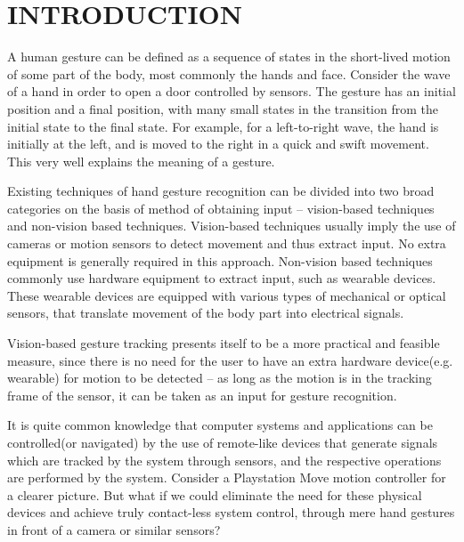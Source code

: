 \documentclass[oneside,a4paper,12pt]{report}
\begin{document}
\tableofcontents
\listoffigures 
\listoftables



\mainmatter











\setlength{\parindent}{11mm}





\chapter{INTRODUCTION}

        A human gesture can be defined as a sequence of states in the short-lived motion of some part of the body, most commonly the hands and face. Consider the wave of a hand in order to open a door controlled by sensors. The gesture has an initial position and a final position, with many small states in the transition from the initial state to the final state. For example, for a left-to-right wave, the hand is initially at the left, and is moved to the right in a quick and swift movement. This very well explains the meaning of a gesture.
    
    
         Existing techniques of hand gesture recognition can be divided into two broad categories on the basis of method of obtaining input – vision-based techniques and non-vision based techniques. Vision-based techniques usually imply the use of cameras or motion sensors to detect movement and thus extract input. No extra equipment is generally required in this approach. Non-vision based techniques commonly use hardware equipment to extract input, such as wearable devices. These wearable devices are equipped with various types of mechanical or optical sensors, that translate movement of the body part into electrical signals.
    
    
         Vision-based gesture tracking presents itself to be a more practical and feasible measure, since there is no need for the user to have an extra hardware device(e.g. wearable) for motion to be detected – as long as the motion is in the tracking frame of the sensor, it can be taken as an input for gesture recognition.
    
    
         It is quite common knowledge that computer systems and applications can be controlled(or navigated) by the use of remote-like devices that generate signals which are tracked by the system through sensors, and the respective operations are performed by the system. Consider a Playstation Move motion controller for a clearer picture. But what if we could eliminate the need for these physical devices and achieve truly contact-less system control, through mere hand gestures in front of a camera or similar sensors?
     
\end{document}
